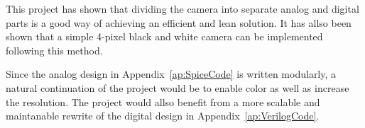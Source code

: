 This project has shown that dividing the camera into separate analog and digital parts is a good way of achieving an efficient and lean solution.
It has allso been shown that a simple 4-pixel black and white camera can be implemented following this method.

Since the analog design in Appendix~\ref{ap:SpiceCode} is written modularly, a natural continuation of the project would be to enable color as well as increase the resolution.
The project would allso benefit from a more scalable and maintanable rewrite of the digital design in Appendix~\ref{ap:VerilogCode}.